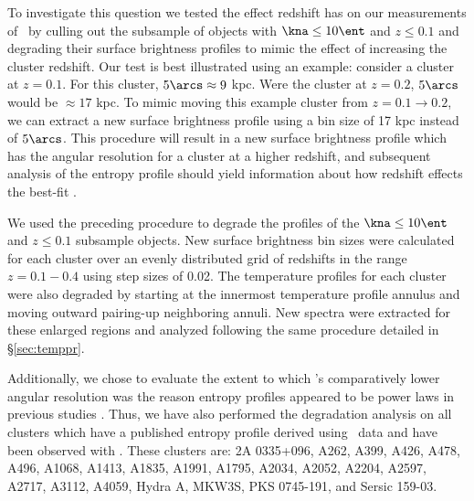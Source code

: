 \documentclass{emulateapj}
\begin{document}
To investigate this question we tested the effect redshift has on our
measurements of \kna\ by culling out the subsample of objects with
$\kna \leq 10 \ent$ and $z \leq 0.1$ and degrading their surface
brightness profiles to mimic the effect of increasing the cluster
redshift. Our test is best illustrated using an example: consider a
cluster at $z = 0.1$. For this cluster, $5\arcs \approx 9$ kpc. Were
the cluster at $z = 0.2$, $5\arcs$ would be $\approx 17$ kpc. To mimic
moving this example cluster from $z = 0.1 \rightarrow 0.2$, we can
extract a new surface brightness profile using a bin size of 17 kpc
instead of $5\arcs$. This procedure will result in a new surface
brightness profile which has the angular resolution for a cluster at a
higher redshift, and subsequent analysis of the entropy profile should
yield information about how redshift effects the best-fit \kna.

We used the preceding procedure to degrade the profiles of the $\kna
\leq 10 \ent$ and $z \leq 0.1$ subsample objects. New surface
brightness bin sizes were calculated for each cluster over an evenly
distributed grid of redshifts in the range $z = 0.1-0.4$ using step
sizes of 0.02. The temperature profiles for each cluster were also
degraded by starting at the innermost temperature profile annulus and
moving outward pairing-up neighboring annuli. New spectra were
extracted for these enlarged regions and analyzed following the same
procedure detailed in \S\ref{sec:temppr}.

Additionally, we chose to evaluate the extent to which \xmm's
comparatively lower angular resolution was the reason entropy profiles
appeared to be power laws in previous studies \citep[see][for
  examples]{piffaretti05, pratt06}. Thus, we have also performed the
degradation analysis on all clusters which have a published entropy
profile derived using \xmm\ data and have been observed with
\chandra. These clusters are: 2A 0335+096, A262, A399, A426, A478,
A496, A1068, A1413, A1835, A1991, A1795, A2034, A2052, A2204, A2597,
A2717, A3112, A4059, Hydra A, MKW3S, PKS 0745-191, and Sersic 159-03.
\end{document}
